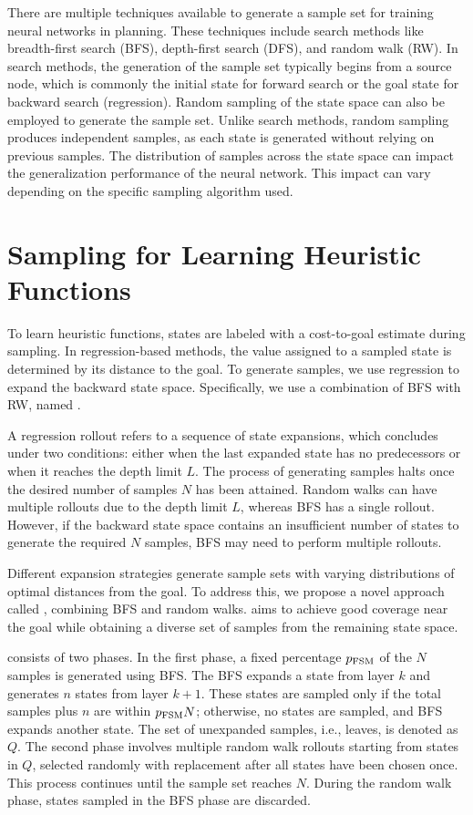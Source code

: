 \documentclass[ppgc,diss,english]{iiufrgs}
\begin{document}
There are multiple techniques available to generate a sample set for training neural networks in planning. These techniques include search methods like breadth-first search (BFS), depth-first search (DFS), and random walk (RW). In search methods, the generation of the sample set typically begins from a source node, which is commonly the initial state for forward search or the goal state for backward search (regression). Random sampling of the state space can also be employed to generate the sample set. Unlike search methods, random sampling produces independent samples, as each state is generated without relying on previous samples. The distribution of samples across the state space can impact the generalization performance of the neural network. This impact can vary depending on the specific sampling algorithm used.

\section{Sampling for Learning Heuristic Functions}
\label{sec:sample-learn-h}
To learn heuristic functions, states are labeled with a cost-to-goal estimate during sampling. In regression-based methods, the value assigned to a sampled state is determined by its distance to the goal. To generate samples, we use regression to expand the backward state space. Specifically, we use a combination of BFS with RW, named \bfsrw.

A regression rollout refers to a sequence of state expansions, which concludes under two conditions: either when the last expanded state has no predecessors or when it reaches the depth limit $L$. The process of generating samples halts once the desired number of samples $N$ has been attained. Random walks can have multiple rollouts due to the depth limit $L$, whereas BFS has a single rollout. However, if the backward state space contains an insufficient number of states to generate the required $N$ samples, BFS may need to perform multiple rollouts.

Different expansion strategies generate sample sets with varying distributions of optimal distances from the goal. To address this, we propose a novel approach called \bfsrw, combining BFS and random walks. \bfsrw aims to achieve good coverage near the goal while obtaining a diverse set of samples from the remaining state space.

\bfsrw consists of two phases. In the first phase, a fixed percentage $p_\text{FSM}$ of the $N$ samples is generated using BFS. The BFS expands a state from layer $k$ and generates $n$ states from layer $k+1$. These states are sampled only if the total samples plus $n$ are within $p_{\text{FSM}}N$; otherwise, no states are sampled, and BFS expands another state. The set of unexpanded samples, i.e., leaves, is denoted as $Q$. The second phase involves multiple random walk rollouts starting from states in $Q$, selected randomly with replacement after all states have been chosen once. This process continues until the sample set reaches $N$. During the random walk phase, states sampled in the BFS phase are discarded.
\end{document}

